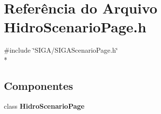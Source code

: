 \section{Referência do Arquivo Hidro\+Scenario\+Page.\+h}
\label{_hidro_scenario_page_8h}
{\ttfamily \#include \char`\"{}S\+I\+G\+A/\+S\+I\+G\+A\+Scenario\+Page.\+h\char`\"{}}\\*
\subsection*{Componentes}
\begin{DoxyCompactItemize}
\item 
class {\bf Hidro\+Scenario\+Page}
\end{DoxyCompactItemize}

